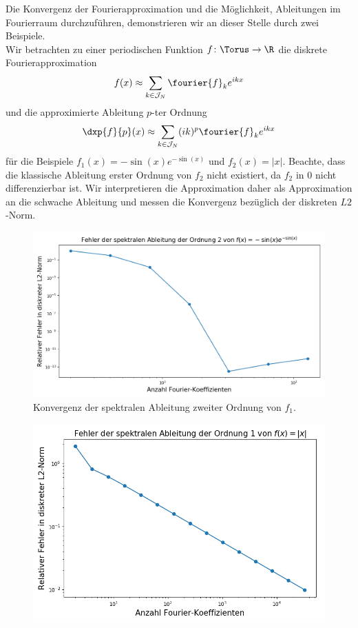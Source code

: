 \begin{mathbsp}
Die Konvergenz der Fourierapproximation und die Möglichkeit, Ableitungen im Fourierraum durchzuführen, demonstrieren wir an dieser Stelle durch zwei Beispiele.\\
Wir betrachten zu einer periodischen Funktion $f\colon\Torus\to\R$ die diskrete Fourierapproximation
\[f(x)\approx \sum_{k\in \mathcal{J}_N}\fourier{f}_ke^{ikx}\]
und die approximierte Ableitung $p$-ter Ordnung
\[\dxp{f}{p}(x)\approx \sum_{k\in \mathcal{J}_N}(ik)^p\fourier{f}_ke^{ikx}\]
für die Beispiele $f_1(x)=-\sin(x)e^{-\sin(x)}$ und $f_2(x)=|x|$. Beachte, dass die klassische Ableitung erster Ordnung von $f_2$ nicht existiert, da $f_2$ in $0$ nicht differenzierbar ist. Wir interpretieren die Approximation daher als Approximation an die schwache Ableitung und messen die Konvergenz bezüglich der diskreten $L2$-Norm.
\begin{figure}[!htb]
  \includegraphics[width=0.9\linewidth]{Figures/spectral_derivative_error_cont.png}
  \caption{Konvergenz der spektralen Ableitung zweiter Ordnung von $f_1$.}
\end{figure}
\begin{figure}[!htb]
  \includegraphics[width=0.9\linewidth]{Figures/spectral_derivative_error_discont.png}

\end{figure}
\end{mathbsp}
